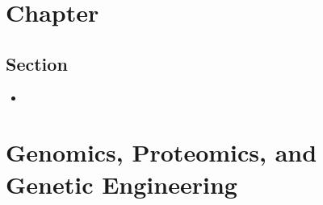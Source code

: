 \documentclass[12pt,a4paper]{article}
\begin{document}
\tableofcontents
\cleardoublepage
\fancyhead{}
\setcounter{section}{7}
\clearpage
\section{Chapter}
\subsection{Section}
\begin{itemize}
    \item 
\end{itemize}
\setcounter{section}{9}
\clearpage
\section{Genomics, Proteomics, and Genetic Engineering}
\end{document}
